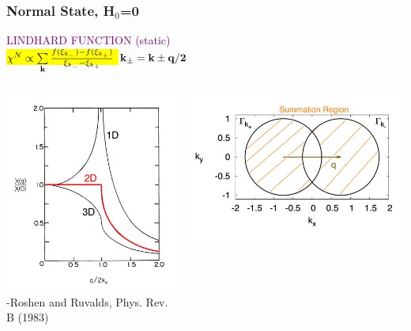 \documentclass{beamer}
\newcommand\Fontvii{\fontsize{4}{4}\selectfont}
\begin{document}
\begin{frame}
\frametitle{Normal State, H$_0$=0}

\begin{center}
\textcolor{purple}{LINDHARD FUNCTION (static)}  \\
\colorbox{yellow}{\textcolor{black}{
$\chi^N\propto\sum\limits_{{\bf k}}\frac{f(\xi_{k_-})-f(\xi_{k_+})}{\xi_{k_-}-\xi_{k_+}}$ }}  $\bf  k_{\pm}=k \pm q/2$ \\
\end{center}

 \begin{columns}
    \begin{column}{0.4\textwidth}
      \centering
      \includegraphics[height=\textwidth, width=\textwidth]{Chi_Nt.jpg} \\
       {\Fontvii 
       -Roshen and Ruvalds, Phys. Rev. B (1983)}
    \end{column}
    \begin{column}{0.6\textwidth}
 \includegraphics[scale=0.07]{SpinPairingN.jpg} \\

\end{column}
\end{columns}
\end{frame}
\end{document}
